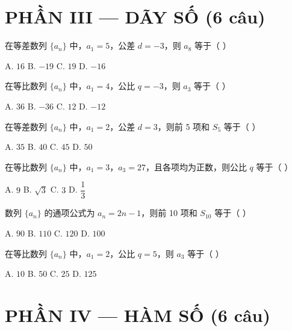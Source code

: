 \documentclass[11pt, a4paper]{article}
\begin{document}
\section{PHẦN III — DÃY SỐ (6 câu)}

\begin{baitap}[20]
在等差数列 $\{a_n\}$ 中，$a_1 = 5$，公差 $d = -3$，则 $a_8$ 等于（ ）
\par\vspace{3pt}
\noindent A. $16$ \quad B. $-19$ \quad C. $19$ \quad D. $-16$
\end{baitap}

\begin{baitap}[21]
在等比数列 $\{a_n\}$ 中，$a_1 = 4$，公比 $q = -3$，则 $a_3$ 等于（ ）
\par\vspace{3pt}
\noindent A. $36$ \quad B. $-36$ \quad C. $12$ \quad D. $-12$
\end{baitap}

\begin{baitap}[22]
在等差数列 $\{a_n\}$ 中，$a_1 = 2$，公差 $d = 3$，则前 5 项和 $S_5$ 等于（ ）
\par\vspace{3pt}
\noindent A. $35$ \quad B. $40$ \quad C. $45$ \quad D. $50$
\end{baitap}

\begin{baitap}[23]
在等比数列 $\{a_n\}$ 中，$a_1 = 3$，$a_3 = 27$，且各项均为正数，则公比 $q$ 等于（ ）
\par\vspace{3pt}
\noindent A. $9$ \quad B. $\sqrt{3}$ \quad C. $3$ \quad D. $\dfrac{1}{3}$
\end{baitap}

\begin{baitap}[24]
数列 $\{a_n\}$ 的通项公式为 $a_n = 2n - 1$，则前 10 项和 $S_{10}$ 等于（ ）
\par\vspace{3pt}
\noindent A. $90$ \quad B. $110$ \quad C. $120$ \quad D. $100$
\end{baitap}

\begin{baitap}[25]
在等比数列 $\{a_n\}$ 中，$a_1 = 2$，公比 $q = 5$，则 $a_3$ 等于（ ）
\par\vspace{3pt}
\noindent A. $10$ \quad B. $50$ \quad C. $25$ \quad D. $125$
\end{baitap}

\section{PHẦN IV — HÀM SỐ (6 câu)}
\end{document}
